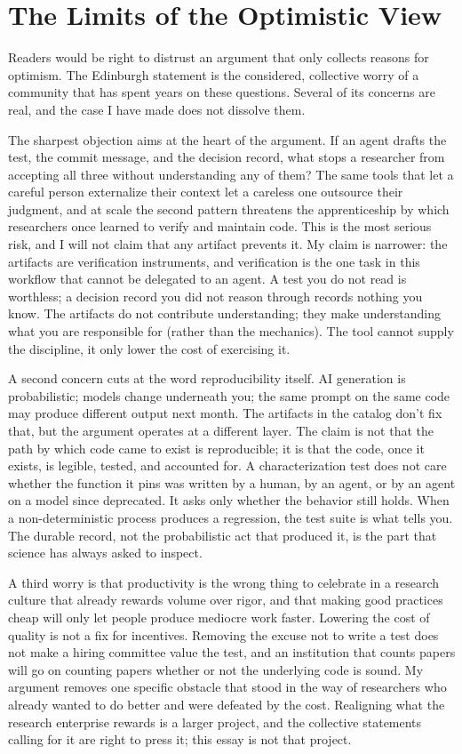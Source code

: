 \documentclass{IEEEcsmag}
\begin{document}
\section{The Limits of the Optimistic View}

Readers would be right to distrust an argument that only collects reasons for optimism. The Edinburgh statement is the considered, collective worry of a community that has spent years on these questions. Several of its concerns are real, and the case I have made does not dissolve them.

The sharpest objection aims at the heart of the argument. If an agent drafts the test, the commit message, and the decision record, what stops a researcher from accepting all three without understanding any of them? The same tools that let a careful person externalize their context let a careless one outsource their judgment, and at scale the second pattern threatens the apprenticeship by which researchers once learned to verify and maintain code. This is the most serious risk, and I will not claim that any artifact prevents it. My claim is narrower: the artifacts are verification instruments, and verification is the one task in this workflow that cannot be delegated to an agent. A test you do not read is worthless; a decision record you did not reason through records nothing you know. The artifacts do not contribute understanding; they make understanding what you are responsible for (rather than the mechanics). The tool cannot supply the discipline, it only lower the cost of exercising it.

A second concern cuts at the word reproducibility itself. AI generation is probabilistic; models change underneath you; the same prompt on the same code may produce different output next month. The artifacts in the catalog don't fix that, but the argument operates at a different layer. The claim is not that the path by which code came to exist is reproducible; it is that the code, once it exists, is legible, tested, and accounted for. A characterization test does not care whether the function it pins was written by a human, by an agent, or by an agent on a model since deprecated. It asks only whether the behavior still holds. When a non-deterministic process produces a regression, the test suite is what tells you. The durable record, not the probabilistic act that produced it, is the part that science has always asked to inspect.

A third worry is that productivity is the wrong thing to celebrate in a research culture that already rewards volume over rigor, and that making good practices cheap will only let people produce mediocre work faster. Lowering the cost of quality is not a fix for incentives. Removing the excuse not to write a test does not make a hiring committee value the test, and an institution that counts papers will go on counting papers whether or not the underlying code is sound. My argument removes one specific obstacle that stood in the way of researchers who already wanted to do better and were defeated by the cost. Realigning what the research enterprise rewards is a larger project, and the collective statements calling for it are right to press it; this essay is not that project.
\end{document}
